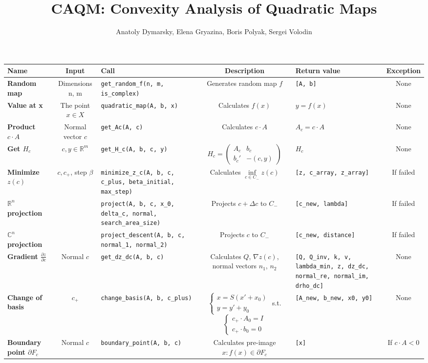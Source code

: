 \documentclass[a4paper]{article}
\title{CAQM: Convexity Analysis of Quadratic Maps}
\date{}
\author{Anatoly Dymarsky, Elena Gryazina, Boris Polyak, Sergei Volodin}
\newcommand{\R}{\mathbb{R}}
\begin{document}
\maketitle
\begin{tabular}{|p{28mm}|c|p{50mm}|c|p{30mm}|c|}
	\hline
	\bf Name & \bf Input & \bf Call & \bf Description & \bf Return value & \bf Exception\\\hline
	\bf Random map & {Dimensions n, m} & {\tt get\_random\_f(n, m, is\_complex)} & Generates random map $f$ & {\tt [A, b]} & None\\\hline
	\bf Value at x & The point $x\in X$ & {\tt quadratic\_map(A, b, x)} & Calculates $f(x)$ & $y=f(x)$ & None\\\hline
	\bf Product $c\cdot A$ & Normal vector $c$ & {\tt get\_Ac(A, c)} & Calculates $c\cdot A$ & $A_c=c\cdot A$ & None\\\hline
	\bf Get $H_c$ & $c,y\in\R^m$ & {\tt get\_H\_c(A, b, c, y)} & $H_c=\left(\begin{array}{cc}A_c & b_c\\b_c' &-(c,y) \end{array}\right)$ & $H_c$ & None\\\hline
	\bf Minimize $z(c)$ & $c,c_+$, step $\beta$ & {\tt minimize\_z\_c(A, b, c, c\_plus, beta\_initial, max\_step)} & Calculates $\inf\limits_{c\in C_-}z(c)$ & {\tt [z, c\_array, z\_array]} & If failed\\\hline
	\bf  $\R^n$ projection & & {\tt project(A, b, c, x\_0, delta\_c, normal, search\_area\_size)} & Projects $c+\Delta c$ to $C_-$ & {\tt [c\_new, lambda]} & If failed\\\hline
	\bf $\mathbb{C}^n$ projection & & {\tt project\_descent(A, b, c, normal\_1, normal\_2)} & Projects $c$ to $C_-$ & {\tt [c\_new, distance]} & If failed\\\hline
	\bf Gradient $\frac{\partial z}{\partial c}$ & Normal $c$ & {\tt get\_dz\_dc(A, b, c)} & Calculates $Q$, $\nabla z(c)$, normal vectors $n_1$, $n_2$ & {\tt [Q, Q\_inv, k, v, lambda\_min, z, dz\_dc, normal\_re, normal\_im, drho\_dc]} & None\\\hline
	\bf Change of basis & $c_+$ & {\tt change\_basis(A, b, c\_plus)} & $\begin{cases}
	x = S(x'+x_0)\\
	y = y' + y_0
	\end{cases}
	$ s.t.
	$\begin{cases}
	c_+\cdot A_0=I\\
	c_+\cdot b_0=0
	\end{cases}$ & {\tt [A\_new, b\_new, x0, y0]} & None\\\hline
	\bf Boundary point $\partial F_c$ & Normal $c$ & {\tt boundary\_point(A, b, c)} & Calculates pre-image $x\colon f(x)\in\partial F_c$ & {\tt [x]} & If $c\cdot A<0$\\\hline
\end{tabular}
\end{document}
